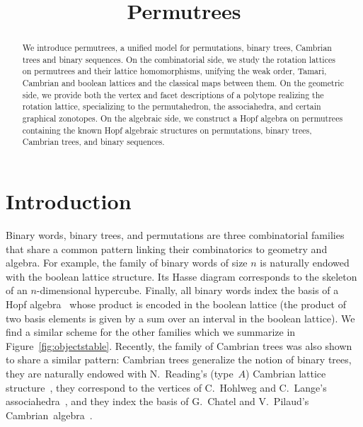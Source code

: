 \documentclass[ALCO]{cedram}
\title{Permutrees}
\author{\firstname{Vincent} \lastname{Pilaud}}
\author{\firstname{Viviane} \lastname{Pons}}
\newcommand{\up}[1]{\overline{#1}}
\newcommand{\fref}[1]{Figure~\ref{#1}} %
\begin{document}
\theoremstyle{definition}
\begin{abstract}
We introduce permutrees, a unified model for permutations, binary trees, Cambrian trees and binary sequences. On the combinatorial side, we study the rotation lattices on permutrees and their lattice homomorphisms, unifying the weak order, Tamari, Cambrian and boolean lattices and the classical maps between them. On the geometric side, we provide both the vertex and facet descriptions of a polytope realizing the rotation lattice, specializing to the permutahedron, the associahedra, and certain graphical zonotopes. On the algebraic side, we construct a Hopf algebra on permutrees containing the known Hopf algebraic structures on permutations, binary trees, Cambrian trees, and binary sequences.
\end{abstract}


\maketitle


\section{Introduction}
\label{sec:intro}

Binary words, binary trees, and permutations are three combinatorial families that share a common pattern linking their combinatorics to geometry and algebra. For example, the family of binary words of size $n$ is naturally endowed with the boolean lattice structure. Its Hasse diagram corresponds to the skeleton of an $n$-dimensional hypercube. Finally, all binary words index the basis of a Hopf algebra~\cite{GelfandKrobLascouxLeclercRetakhThibon} whose product is encoded in the boolean lattice (the product of two basis elements is given by a sum over an interval in the boolean lattice).
We find a similar scheme for the other families which we summarize in \fref{fig:objectstable}. 
Recently, the family of Cambrian trees was also shown to share a similar pattern: Cambrian trees generalize the notion of binary trees, they are naturally endowed with N.~Reading's (type~$A$) Cambrian lattice structure~\cite{Reading-CambrianLattices}, they correspond to the vertices of C.~Hohlweg and C.~Lange's associahedra~\cite{HohlwegLange}, and they index the basis of G.~Chatel and V.~Pilaud's Cambrian~algebra~\cite{ChatelPilaud}.
\end{document}

